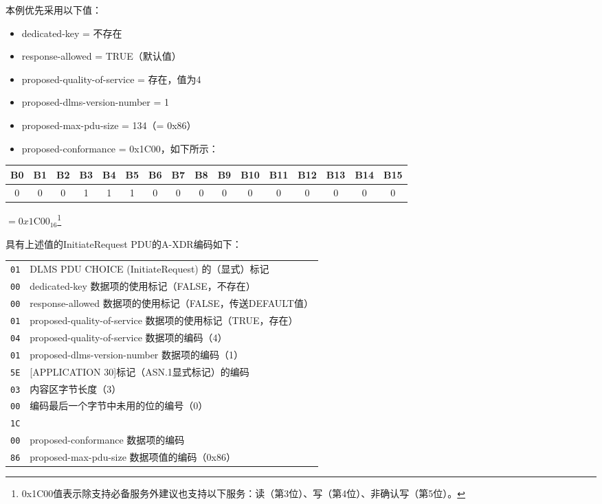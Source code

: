 \documentclass[a4paper,11pt]{ctexart}
\begin{document}
\noindent 本例优先采用以下值：
\begin{itemize}[leftmargin=4em]
\item dedicated-key = 不存在
\item response-allowed = TRUE（默认值）
\item proposed-quality-of-service = 存在，值为4
\item proposed-dlms-version-number = 1
\item proposed-max-pdu-size = 134（= 0x86）
\item proposed-conformance = 0x1C00，如下所示：
\end{itemize}

\begin{center}
\begin{tabular}{|c|c|c|c|c|c|c|c|c|c|c|c|c|c|c|c|}
\hline
B0 & B1 & B2 & B3 & B4 & B5 & B6 & B7 & B8 & B9 & B10 & B11 & B12 & B13 & B14 & B15 \\
\hline
0 & 0 & 0 & 1 & 1 & 1 & 0 & 0 & 0 & 0 & 0 & 0 & 0 & 0 & 0 & 0 \\
\hline
\end{tabular}
\end{center}

\noindent $= 0x\text{1C00}_{16}$\footnote{0x1C00值表示除支持必备服务外建议也支持以下服务：读（第3位）、写（第4位）、非确认写（第5位）。}

具有上述值的InitiateRequest PDU的A-XDR编码如下：

\begin{center}
\begin{tabular}{ll}
\texttt{01} & DLMS PDU CHOICE (InitiateRequest) 的（显式）标记 \\
\texttt{00} & dedicated-key 数据项的使用标记（FALSE，不存在）\\
\texttt{00} & response-allowed 数据项的使用标记（FALSE，传送DEFAULT值）\\
\texttt{01} & proposed-quality-of-service 数据项的使用标记（TRUE，存在）\\
\texttt{04} & proposed-quality-of-service 数据项的编码（4）\\
\texttt{01} & proposed-dlms-version-number 数据项的编码（1）\\
\texttt{5E} & [APPLICATION 30]标记（ASN.1显式标记）的编码 \\
\texttt{03} & 内容区字节长度（3） \\
\texttt{00} & 编码最后一个字节中未用的位的编号（0）\\
\texttt{1C} & \\
\texttt{00} & proposed-conformance 数据项的编码 \\
\texttt{86} & proposed-max-pdu-size 数据项值的编码（0x86）\\
\end{tabular}
\end{center}
\end{document}
